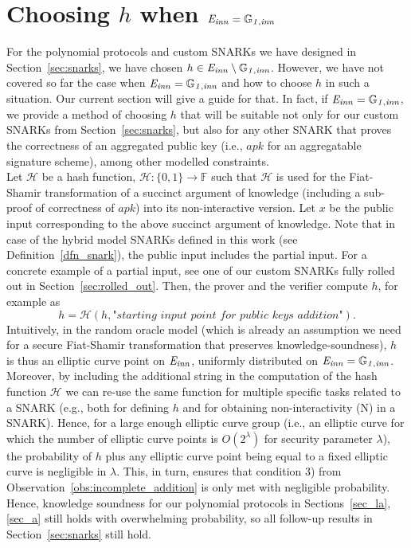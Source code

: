 \section{Choosing $h$ when $\mathit{E}_{\mathit{inn}} = \mathbb{G}_{\mathit{1,inn}}$}
\label{sec:other_choice_h}

\noindent For the polynomial protocols and custom SNARKs we have designed in Section~\ref{sec:snarks}, we have chosen 
$h \in \mathit{E}_{\mathit{inn}} \setminus \mathbb{G}_{\mathit{1,inn}}$. However, we have not covered so far the case when $\mathit{E}_{\mathit{inn}} = \mathbb{G}_{\mathit{1,inn}}$ and how to 
choose $h$ in such a situation. Our current section will give a guide for that. In fact, if $\mathit{E}_{\mathit{inn}} = \mathbb{G}_{\mathit{1,inn}}$, we provide a 
method of choosing $h$ that will be suitable not only for our custom SNARKs from Section~\ref{sec:snarks}, but also for any other 
SNARK that proves the correctness of an aggregated public key (i.e., $\mathit{apk}$ for an aggregatable signature scheme), 
among other modelled constraints. \\

\noindent Let $\mathcal{H}$ be a hash function, $\mathcal{H}: \{0, 1\} \rightarrow \mathbb{F}$ such that $\mathcal{H}$ is used for 
the Fiat-Shamir transformation of a succinct argument of knowledge (including a sub-proof of correctness of $\mathit{apk}$) 
into its non-interactive version. Let $x$ be the public input corresponding to the above succinct argument of knowledge. 
Note that in case of the hybrid model SNARKs defined in this work (see Definition~\ref{dfn_snark}), the public input includes the partial input. 
For a concrete example of a partial input, see one of our custom SNARKs fully rolled out in Section~\ref{sec:rolled_out}. Then, the prover and 
the verifier compute $h$, for example as 
$$h = \mathcal{H}(h, \textit{"starting \ input \ point \ for \ public \ keys \ addition"}).$$
Intuitively, in the random oracle model (which is already an assumption we need for a secure Fiat-Shamir transformation that preserves 
knowledge-soundness), $h$ is thus an elliptic curve point on $\mathit{E}_{\mathit{inn}}$, uniformly distributed on $\mathit{E}_{\mathit{inn}} = \mathbb{G}_{\mathit{1,inn}}$. Moreover, by including 
the additional string in the computation of the hash function $\mathcal{H}$ we can re-use the same function for multiple specific tasks 
related to a SNARK (e.g., both for defining $h$ and for obtaining non-interactivity (N) in a SNARK). Hence, for a large enough elliptic 
curve group (i.e., an elliptic curve for which the number of elliptic curve points is $O(2^{\lambda})$ for security parameter $\lambda$), 
the probability of $h$ plus any elliptic curve point being equal to a fixed elliptic curve is negligible in $\lambda$. This, in turn, ensures that 
condition 3) from Observation~\ref{obs:incomplete_addition} is only met with negligible probability. Hence, knowledge soundness 
for our polynomial protocols in Sections~\ref{sec_la},\ref{sec_a} still holds with overwhelming probability, so all follow-up results in 
Section~\ref{sec:snarks} still hold. 
